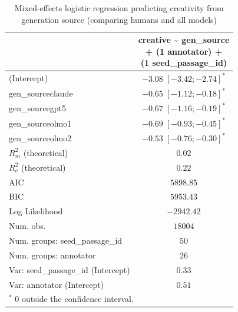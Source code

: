 
\usepackage{booktabs}

\begin{table}[htbp]
\begin{center}
\begin{tabular}{l c}
\toprule
 & \shortstack[l]{creative \textasciitilde{} gen\_source  \\ 
+ (1 \textbar{} annotator) + \\ 
(1 \textbar{} seed\_passage\_id)} \\
\midrule
(Intercept)                        & $-3.08 \; [-3.42; -2.74]^{*}$ \\
gen\_sourceclaude                  & $-0.65 \; [-1.12; -0.18]^{*}$ \\
gen\_sourcegpt5                    & $-0.67 \; [-1.16; -0.19]^{*}$ \\
gen\_sourceolmo1                   & $-0.69 \; [-0.93; -0.45]^{*}$ \\
gen\_sourceolmo2                   & $-0.53 \; [-0.76; -0.30]^{*}$ \\
\midrule
$R^2_m$ (theoretical)              & $0.02$                        \\
$R^2_c$ (theoretical)              & $0.22$                        \\
AIC                                & $5898.85$                     \\
BIC                                & $5953.43$                     \\
Log Likelihood                     & $-2942.42$                    \\
Num. obs.                          & $18004$                       \\
Num. groups: seed\_passage\_id     & $50$                          \\
Num. groups: annotator             & $26$                          \\
Var: seed\_passage\_id (Intercept) & $0.33$                        \\
Var: annotator (Intercept)         & $0.51$                        \\
\bottomrule
\multicolumn{2}{l}{\scriptsize{$^*$ 0 outside the confidence interval.}}
\end{tabular}
\caption{Mixed-effects logistic regression predicting creativity from generation source (comparing humans and all models)}
\label{tab:glmer_nov_src_front}
\end{center}
\end{table}
